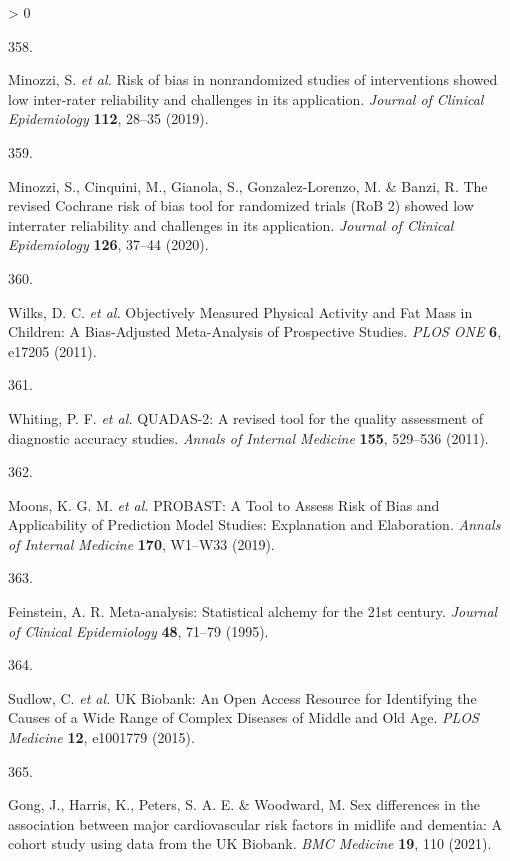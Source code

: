 \documentclass[a4paper, twoside]{templates/ociamthesis}
\newlength{\cslhangindent}
\newlength{\csllabelwidth}
\newenvironment{CSLReferences}[3] %
 {%
  \setlength{\parindent}{0pt}
  \ifodd #1 \everypar{\setlength{\hangindent}{\cslhangindent}}\ignorespaces\fi
  \ifnum #2 > 0
  \setlength{\parskip}{#2\baselineskip}
  \fi
 }%
 {}
\newcommand{\CSLLeftMargin}[1]{\parbox[t]{\maxof{\widthof{#1}}{\csllabelwidth}}{#1}}
\newcommand{\CSLRightInline}[1]{\parbox[t]{\linewidth - \csllabelwidth}{#1}}
\begin{document}
\begin{CSLReferences}{0}{0}
\leavevmode\hypertarget{ref-minozzi2019}{}%
\CSLLeftMargin{358. }
\CSLRightInline{Minozzi, S. \emph{et al.} Risk of bias in nonrandomized studies of interventions showed low inter-rater reliability and challenges in its application. \emph{Journal of Clinical Epidemiology} \textbf{112}, 28--35 (2019).}

\leavevmode\hypertarget{ref-minozzi2020}{}%
\CSLLeftMargin{359. }
\CSLRightInline{Minozzi, S., Cinquini, M., Gianola, S., Gonzalez-Lorenzo, M. \& Banzi, R. The revised {Cochrane} risk of bias tool for randomized trials ({RoB} 2) showed low interrater reliability and challenges in its application. \emph{Journal of Clinical Epidemiology} \textbf{126}, 37--44 (2020).}

\leavevmode\hypertarget{ref-wilks2011}{}%
\CSLLeftMargin{360. }
\CSLRightInline{Wilks, D. C. \emph{et al.} Objectively {Measured Physical Activity} and {Fat Mass} in {Children}: A {Bias}-{Adjusted Meta}-{Analysis} of {Prospective Studies}. \emph{PLOS ONE} \textbf{6}, e17205 (2011).}

\leavevmode\hypertarget{ref-whiting2011}{}%
\CSLLeftMargin{361. }
\CSLRightInline{Whiting, P. F. \emph{et al.} {QUADAS}-2: A revised tool for the quality assessment of diagnostic accuracy studies. \emph{Annals of Internal Medicine} \textbf{155}, 529--536 (2011).}

\leavevmode\hypertarget{ref-moons2019}{}%
\CSLLeftMargin{362. }
\CSLRightInline{Moons, K. G. M. \emph{et al.} {PROBAST}: A {Tool} to {Assess Risk} of {Bias} and {Applicability} of {Prediction Model Studies}: Explanation and {Elaboration}. \emph{Annals of Internal Medicine} \textbf{170}, W1--W33 (2019).}

\leavevmode\hypertarget{ref-feinstein1995}{}%
\CSLLeftMargin{363. }
\CSLRightInline{Feinstein, A. R. Meta-analysis: Statistical alchemy for the 21st century. \emph{Journal of Clinical Epidemiology} \textbf{48}, 71--79 (1995).}

\leavevmode\hypertarget{ref-sudlow2015}{}%
\CSLLeftMargin{364. }
\CSLRightInline{Sudlow, C. \emph{et al.} {UK Biobank}: An {Open Access Resource} for {Identifying} the {Causes} of a {Wide Range} of {Complex Diseases} of {Middle} and {Old Age}. \emph{PLOS Medicine} \textbf{12}, e1001779 (2015).}

\leavevmode\hypertarget{ref-gong2021}{}%
\CSLLeftMargin{365. }
\CSLRightInline{Gong, J., Harris, K., Peters, S. A. E. \& Woodward, M. Sex differences in the association between major cardiovascular risk factors in midlife and dementia: A cohort study using data from the {UK Biobank}. \emph{BMC Medicine} \textbf{19}, 110 (2021).}


\end{CSLReferences}
\end{document}
